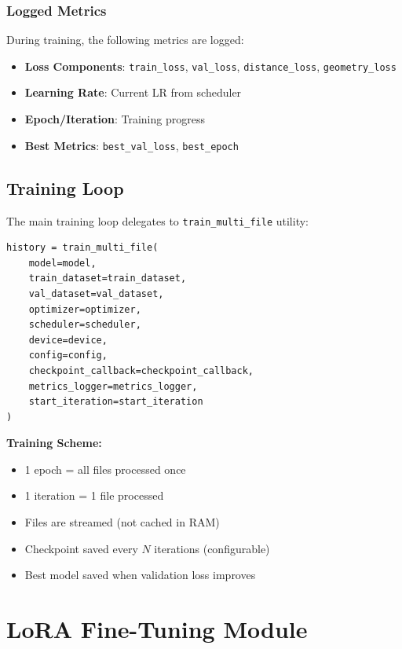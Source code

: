 \documentclass[11pt,a4paper]{article}
\begin{document}
\subsubsection{Logged Metrics}

During training, the following metrics are logged:
\begin{itemize}
    \item \textbf{Loss Components}: \texttt{train\_loss}, \texttt{val\_loss}, \texttt{distance\_loss}, \texttt{geometry\_loss}
    \item \textbf{Learning Rate}: Current LR from scheduler
    \item \textbf{Epoch/Iteration}: Training progress
    \item \textbf{Best Metrics}: \texttt{best\_val\_loss}, \texttt{best\_epoch}
\end{itemize}

\subsection{Training Loop}

The main training loop delegates to \texttt{train\_multi\_file} utility:

\begin{lstlisting}[caption={Main Training (lines 593-609)}]
history = train_multi_file(
    model=model,
    train_dataset=train_dataset,
    val_dataset=val_dataset,
    optimizer=optimizer,
    scheduler=scheduler,
    device=device,
    config=config,
    checkpoint_callback=checkpoint_callback,
    metrics_logger=metrics_logger,
    start_iteration=start_iteration
)
\end{lstlisting}

\textbf{Training Scheme:}
\begin{itemize}
    \item 1 epoch = all files processed once
    \item 1 iteration = 1 file processed
    \item Files are streamed (not cached in RAM)
    \item Checkpoint saved every $N$ iterations (configurable)
    \item Best model saved when validation loss improves
\end{itemize}

\clearpage

\section{LoRA Fine-Tuning Module}
\end{document}
